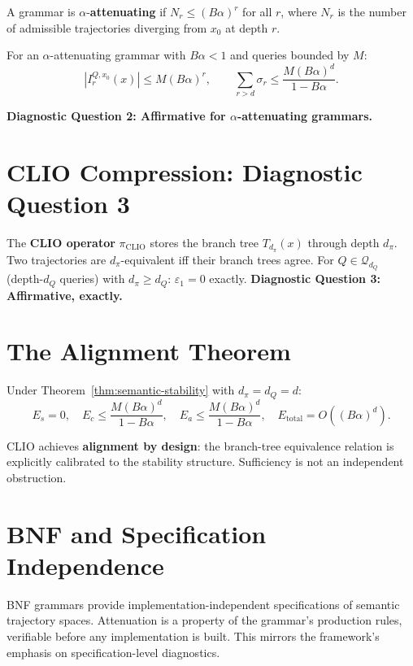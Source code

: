 A grammar is $\alpha$-\textbf{attenuating} if $N_r \leq (B\alpha)^r$ for all $r$, where $N_r$ is the number of admissible trajectories diverging from $x_0$ at depth $r$.

\begin{theorem}
\label{thm:semantic-stability}
For an $\alpha$-attenuating grammar with $B\alpha < 1$ and queries bounded by $M$:
\[
  |I_r^{Q,x_0}(x)| \leq M(B\alpha)^r, \qquad \sum_{r>d} \sigma_r \leq \frac{M(B\alpha)^d}{1-B\alpha}.
\]
\end{theorem}

\textbf{Diagnostic Question 2: Affirmative for $\alpha$-attenuating grammars.}

\section{CLIO Compression: Diagnostic Question 3}

The \textbf{CLIO operator} $\pi_{\mathrm{CLIO}}$ stores the branch tree $T_{d_\pi}(x)$ through depth $d_\pi$. Two trajectories are $d_\pi$-equivalent iff their branch trees agree. For $Q \in \mathcal{Q}_{d_Q}$ (depth-$d_Q$ queries) with $d_\pi \geq d_Q$: $\varepsilon_1 = 0$ exactly. \textbf{Diagnostic Question 3: Affirmative, exactly.}

\section{The Alignment Theorem}

\begin{theorem}
\label{thm:semantic-alignment}
Under Theorem~\ref{thm:semantic-stability} with $d_\pi = d_Q = d$:
\[
  E_s = 0, \quad E_c \leq \frac{M(B\alpha)^d}{1-B\alpha}, \quad E_a \leq \frac{M(B\alpha)^d}{1-B\alpha}, \quad E_{\mathrm{total}} = O((B\alpha)^d).
\]
\end{theorem}

CLIO achieves \textbf{alignment by design}: the branch-tree equivalence relation is explicitly calibrated to the stability structure. Sufficiency is not an independent obstruction.

\section{BNF and Specification Independence}

BNF grammars provide implementation-independent specifications of semantic trajectory spaces. Attenuation is a property of the grammar's production rules, verifiable before any implementation is built. This mirrors the framework's emphasis on specification-level diagnostics.


